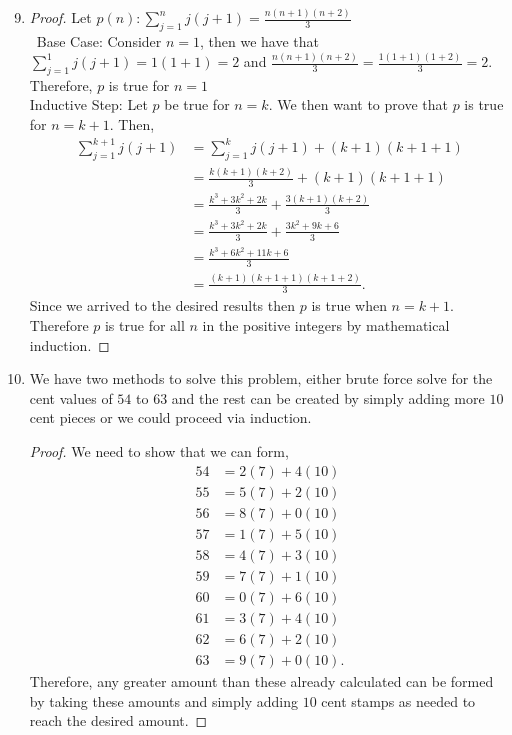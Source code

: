 \documentclass{article}
\begin{document}
\begin{enumerate}
    \setcounter{enumi}{8}
    \item
    
    \begin{proof}
    Let $p(n): \sum_{j=1}^nj(j+1) = \frac{n(n+1)(n+2)}{3}$\\\
    Base Case: Consider $n=1$, then we have that $\sum_{j=1}^1j(j+1) = 1(1+1) = 2$ and $\frac{n(n+1)(n+2)}{3} = \frac{1(1+1)(1+2)}{3} = 2$. Therefore, $p$ is true for $n=1$\\
    Inductive Step: Let $p$ be true for $n=k$. We then want to prove that $p$ is true for $n=k+1.$ Then, 
    \begin{align*}
    \sum_{j=1}^{k+1}j(j+1) &= \sum_{j=1}^{k}j(j+1)+(k+1)(k+1+1)\\
    &= \frac{k(k+1)(k+2)}{3}+(k+1)(k+1+1)\\
    &= \frac{k^3+3k^2+2k}{3}+\frac{3(k+1)(k+2)}{3}\\
    &= \frac{k^3+3k^2+2k}{3}+\frac{3k^2+9k+6}{3}\\
    &= \frac{k^3+6k^2+11k+6}{3}\\
    &= \frac{(k+1)(k+1+1)(k+1+2)}{3}.
    \end{align*} Since we arrived to the desired results then $p$ is true when $n=k+1$. Therefore $p$ is true for all $n$ in the positive integers by mathematical induction.
    \end{proof}
    
    \setcounter{enumi}{13}
    \item
    
    We have two methods to solve this problem, either brute force solve for the cent values of $54$ to $63$ and the rest can be created by simply adding more $10$ cent pieces or we could proceed via induction.
    \begin{proof} We need to show that we can form,
    \begin{align*}
    54 &= 2(7)+4(10)\\
    55 &= 5(7)+2(10)\\
    56 &= 8(7)+0(10)\\
    57 &= 1(7)+5(10)\\
    58 &= 4(7)+3(10)\\
    59 &= 7(7)+1(10)\\
    60 &= 0(7)+6(10)\\
    61 &= 3(7)+4(10)\\
    62 &= 6(7)+2(10)\\
    63 &= 9(7)+0(10).
    \end{align*}Therefore, any greater amount than these already calculated can be formed by taking these amounts and simply adding $10$ cent stamps as needed to reach the desired amount. 
    \end{proof}
    

\end{enumerate}
\end{document}
